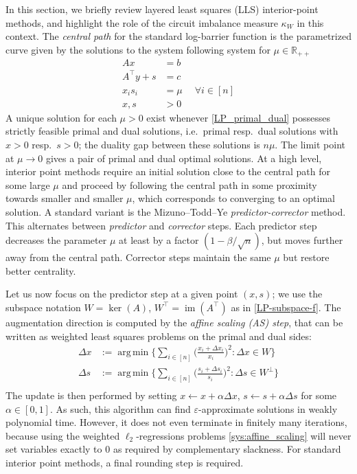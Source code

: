 \documentclass[11pt, a4paper]{article}
\newcommand{\Le}{\kappa}
\newcommand{\1}{\mathbbm{1}}
\theoremstyle{case}
\DeclareMathOperator*{\argmin}{arg\,min}
\newcommand{\R}{\mathbb{R}}
\begin{document}
In this section, we briefly review layered least squares (LLS) interior-point methods, and highlight the role of the circuit imbalance measure $\Le_W$ in this context.
The \emph{central path} for the standard log-barrier function is the  parametrized curve given by the solutions to the system following system for $\mu\in \R_{++}$
\begin{equation}
  \label{sys:central_path}
  \begin{aligned}
  Ax &= b \\
  A^\top y + s & = c\\
  x_is_i &= \mu \;\quad \forall i \in [n]\\
  x, s &>0
  \end{aligned}
\end{equation}
 A unique solution for each $\mu>0$ exist whenever \ref{LP_primal_dual} possesses strictly feasible primal and dual solutions, i.e.\ primal resp.~dual solutions with $x > 0$ resp.~$s > 0$; the duality gap between these solutions is $n\mu$. The limit point at $\mu\to 0$ gives a pair of primal and dual optimal solutions.
At a high level,  interior point methods require an initial solution close to the central path for some large $\mu$ and proceed by following the central path in some proximity towards smaller and smaller $\mu$, which corresponds to converging to an optimal solution. A standard variant is the Mizuno--Todd--Ye \cite{MTY} \emph{predictor-corrector} method. This alternates between \emph{predictor} and \emph{corrector} steps. Each predictor step decreases the parameter $\mu$ at least by a factor $(1-\beta/\sqrt{n})$, but moves further away from the central path. Corrector steps maintain the same $\mu$ but restore better centrality. 

Let us now focus on the predictor step at a given point $(x,s)$; we use the subspace notation $W=\ker(A)$, $W^\top=\operatorname{im}(A^\top)$ as in \ref{LP-subspace-f}. The augmentation direction is computed by the \emph{affine scaling (AS) step}, that can be written as 
weighted least squares problems on the primal and dual sides:
\begin{equation}
  \label{sys:affine_scaling}
  \begin{aligned}
\Delta x &:= \argmin \Big\{\sum_{i \in [n]} \Big(\frac{x_i + \Delta x_i}{x_i}\Big)^2 : \Delta x \in W\Big\} \\
\Delta s &:= \argmin \Big\{\sum_{i \in [n]} \Big(\frac{s_i + \Delta s_i}{s_i}\Big)^2 : \Delta s \in W^\perp\Big\} \\
  \end{aligned}
\end{equation}
The update is then performed by setting $x \gets x + \alpha \Delta x$, $s \gets s + \alpha \Delta s$
for some $\alpha \in [0,1]$. As such, this algorithm can find $\varepsilon$-approximate solutions in weakly polynomial time. However,  it does not even terminate in finitely many iterations,
because using the weighted $\ell_2$-regressions problems \eqref{sys:affine_scaling} will never set variables exactly to 0
as required by complementary slackness. For standard interior point methods, a final rounding step is required.
\end{document}
